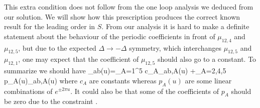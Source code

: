This extra condition does not follow from the one loop analysis we deduced from our solution.
We will show how this prescription produces the correct known result for the leading order in $S$.
From our analysis it is hard to make a definite statement about the behaviour of the periodic coefficients in front of $\mu_{12,4}$ and  $\mu_{12,5}$, but due to the expected $\Delta \to-\Delta$ symmetry, which interchanges $\mu_{12,5}$ and $\mu_{12,1}$, one may expect that the coefficient of $\mu_{12,5}$ should also go to a constant. 
To summarize we should have
\beq\label{prescr}
\mu_{ab}(u)=\sum_{A=1}^5 c_{A}\mu_{ab,A}(u)
+\sum_{A=2,4,5} p_{A}(u)\mu_{ab,A}(u)
\eeq
where $c_A$ are constants whereas $p_{A}(u)$ are some linear combinations of $e^{\pm 2\pi u}$. 
It could also be that some of the coefficients of $p_{A}$ should be zero due to the constraint .

